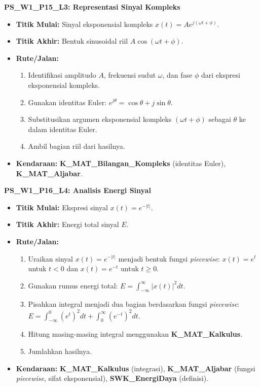 \documentclass[
  letterpaper,
  DIV=11,
  numbers=noendperiod]{scrreprt}
\providecommand{\tightlist}{%
  \setlength{\itemsep}{0pt}\setlength{\parskip}{0pt}}\usepackage{longtable,booktabs,array}
\begin{document}
\textbf{PS\_W1\_P15\_L3: Representasi Sinyal Kompleks}

\begin{itemize}
\tightlist
\item
  \textbf{Titik Mulai:} Sinyal eksponensial kompleks
  \(x(t) = A e^{j(\omega t + \phi)}\).
\item
  \textbf{Titik Akhir:} Bentuk sinusoidal riil
  \(A \cos(\omega t + \phi)\).
\item
  \textbf{Rute/Jalan:}

  \begin{enumerate}
  \def\labelenumi{\arabic{enumi}.}
  \tightlist
  \item
    Identifikasi amplitudo \(A\), frekuensi sudut \(\omega\), dan fase
    \(\phi\) dari ekspresi eksponensial kompleks.
  \item
    Gunakan identitas Euler:
    \(e^{j\theta} = \cos\theta + j \sin\theta\).
  \item
    Substitusikan argumen eksponensial kompleks \((\omega t + \phi)\)
    sebagai \(\theta\) ke dalam identitas Euler.
  \item
    Ambil bagian riil dari hasilnya.
  \end{enumerate}
\item
  \textbf{Kendaraan:} \textbf{K\_MAT\_Bilangan\_Kompleks} (identitas
  Euler), \textbf{K\_MAT\_Aljabar}.
\end{itemize}

\textbf{PS\_W1\_P16\_L4: Analisis Energi Sinyal}

\begin{itemize}
\tightlist
\item
  \textbf{Titik Mulai:} Ekspresi sinyal \(x(t) = e^{-|t|}\).
\item
  \textbf{Titik Akhir:} Energi total sinyal \(E\).
\item
  \textbf{Rute/Jalan:}

  \begin{enumerate}
  \def\labelenumi{\arabic{enumi}.}
  \tightlist
  \item
    Uraikan sinyal \(x(t) = e^{-|t|}\) menjadi bentuk fungsi
    \emph{piecewise}: \(x(t) = e^t\) untuk \(t<0\) dan \(x(t) = e^{-t}\)
    untuk \(t \ge 0\).
  \item
    Gunakan rumus energi total:
    \(E = \int_{-\infty}^{\infty} |x(t)|^2 dt\).
  \item
    Pisahkan integral menjadi dua bagian berdasarkan fungsi
    \emph{piecewise}:
    \(E = \int_{-\infty}^{0} (e^t)^2 dt + \int_{0}^{\infty} (e^{-t})^2 dt\).
  \item
    Hitung masing-masing integral menggunakan \textbf{K\_MAT\_Kalkulus}.
  \item
    Jumlahkan hasilnya.
  \end{enumerate}
\item
  \textbf{Kendaraan:} \textbf{K\_MAT\_Kalkulus} (integrasi),
  \textbf{K\_MAT\_Aljabar} (fungsi \emph{piecewise}, sifat
  eksponensial), \textbf{SWK\_EnergiDaya} (definisi).
\end{itemize}
\end{document}
